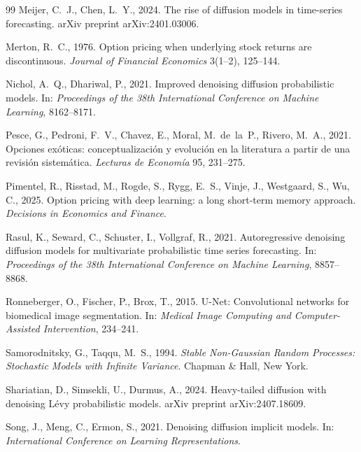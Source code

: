 ﻿\documentclass[12pt,letterpaper]{article}
\begin{document}
\begin{thebibliography}{99}
Meijer, C.~J., Chen, L.~Y., 2024. The rise of diffusion models in
time-series forecasting. arXiv preprint arXiv:2401.03006.

Merton, R.~C., 1976. Option pricing when underlying stock returns are
discontinuous. \emph{Journal of Financial Economics} 3(1--2), 125--144.

Nichol, A.~Q., Dhariwal, P., 2021. Improved denoising diffusion
probabilistic models. In: \emph{Proceedings of the 38th International
Conference on Machine Learning}, 8162--8171.

Pesce, G., Pedroni, F.~V., Chavez, E., Moral, M.~de~la~P., Rivero, M.~A.,
2021. Opciones ex\'oticas: conceptualizaci\'on y evoluci\'on en la
literatura a partir de una revisi\'on sistem\'atica. \emph{Lecturas de
Econom\'ia} 95, 231--275.

Pimentel, R., Risstad, M., Rogde, S., Rygg, E.~S., Vinje, J., Westgaard,
S., Wu, C., 2025. Option pricing with deep learning: a long short-term
memory approach. \emph{Decisions in Economics and Finance}.

Rasul, K., Seward, C., Schuster, I., Vollgraf, R., 2021. Autoregressive
denoising diffusion models for multivariate probabilistic time series
forecasting. In: \emph{Proceedings of the 38th International Conference on
Machine Learning}, 8857--8868.

Ronneberger, O., Fischer, P., Brox, T., 2015. U-Net: Convolutional networks
for biomedical image segmentation. In: \emph{Medical Image Computing and
Computer-Assisted Intervention}, 234--241.

Samorodnitsky, G., Taqqu, M.~S., 1994. \emph{Stable Non-Gaussian Random
Processes: Stochastic Models with Infinite Variance}. Chapman \& Hall, New
York.

Shariatian, D., Simsekli, U., Durmus, A., 2024. Heavy-tailed diffusion with
denoising L\'evy probabilistic models. arXiv preprint arXiv:2407.18609.

Song, J., Meng, C., Ermon, S., 2021. Denoising diffusion implicit models.
In: \emph{International Conference on Learning Representations}.


\end{thebibliography}
\end{document}
